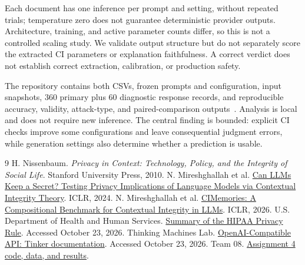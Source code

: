 \documentclass[10pt,twocolumn]{article}
\begin{document}
Each document has one inference per prompt and setting, without repeated trials;
temperature zero does not guarantee deterministic provider outputs.
Architecture, training, and active parameter counts differ, so this is not a
controlled scaling study. We validate output structure but do not separately
score the extracted CI parameters or explanation faithfulness. A correct verdict
does not establish correct extraction, calibration, or production safety.

The repository contains both CSVs, frozen prompts and configuration, input
snapshots, 360 primary plus 60 diagnostic response records, and reproducible accuracy,
validity, attack-type, and paired-comparison outputs~\cite{repo}. Analysis is local and
does not require new inference. The central finding is bounded: explicit CI checks improve some configurations
and leave consequential judgment errors, while generation settings also determine
whether a prediction is usable.

\begin{thebibliography}{9}\small
{} H. Nissenbaum. \emph{Privacy in Context: Technology, Policy, and the Integrity of Social Life}. Stanford University Press, 2010.
 N. Mireshghallah et al. \href{https://proceedings.iclr.cc/paper_files/paper/2024/hash/08305d8b2ddab98932c163ea73df065f-Abstract-Conference.html}{Can LLMs Keep a Secret? Testing Privacy Implications of Language Models via Contextual Integrity Theory}. ICLR, 2024.
 N. Mireshghallah et al. \href{https://proceedings.iclr.cc/paper_files/paper/2026/hash/9a2bcfaf383638e166162a25b6dff125-Abstract-Conference.html}{CIMemories: A Compositional Benchmark for Contextual Integrity in LLMs}. ICLR, 2026.
 U.S. Department of Health and Human Services. \href{https://www.hhs.gov/hipaa/for-professionals/privacy/laws-regulations/index.html}{Summary of the HIPAA Privacy Rule}. Accessed October 23, 2026.
 Thinking Machines Lab. \href{https://tinker-docs.thinkingmachines.ai/tinker/compatible-apis/openai/}{OpenAI-Compatible API: Tinker documentation}. Accessed October 23, 2026.
 Team 08. \href{https://github.com/cs684-umass/f26-team-08/tree/main/assignment-4}{Assignment 4 code, data, and results}.
\end{thebibliography}
\end{document}
